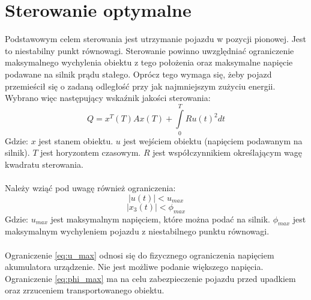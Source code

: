 \section{Sterowanie optymalne}
\label{sec:sterowanie_optymalne}

Podstawowym celem sterowania jest utrzymanie pojazdu w pozycji pionowej. Jest to niestabilny punkt równowagi. Sterowanie powinno uwzględniać ograniczenie maksymalnego wychylenia obiektu z tego położenia oraz maksymalne napięcie podawane na silnik prądu stałego. Oprócz tego wymaga się, żeby pojazd przemieścił się o zadaną odległość przy jak najmniejszym zużyciu energii. Wybrano więc następujący wskaźnik jakości sterowania:
\begin{equation}
Q=x^T(T)Ax(T)+\int\limits_{0}^{T}Ru(t)^2dt
\end{equation}
\noindent Gdzie:\newline
\(x\) jest stanem obiektu.\newline
\(u\) jest wejściem obiektu (napięciem podawanym na silnik).\newline
\(T\) jest horyzontem czasowym.\newline
\(R\) jest współczynnikiem określającym wagę kwadratu sterowania.

\paragraph*{}
Należy wziąć pod uwagę również ograniczenia:
\begin{equation}
|u(t)|< u_{max}
\label{eq:u_max}
\end{equation}
\begin{equation}
|x_3(t)|< \phi_{max}
\label{eq:phi_max}
\end{equation}
\noindent Gdzie:\newline
\(u_{max}\) jest maksymalnym napięciem, które można podać na silnik.\newline
\(\phi_{max}\) jest maksymalnym wychyleniem pojazdu z niestabilnego punktu równowagi.

\paragraph*{}
Ograniczenie \eqref{eq:u_max} odnosi się do fizycznego ograniczenia napięciem akumulatora urządzenie. Nie jest możliwe podanie większego napięcia. Ograniczenie \eqref{eq:phi_max} ma na celu zabezpieczenie pojazdu przed upadkiem oraz zrzuceniem transportowanego obiektu.